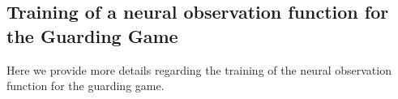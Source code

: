 








\subsection*{Training of a neural observation function for the Guarding Game} 

Here we provide more details regarding the training of the neural observation
function for the guarding game.

